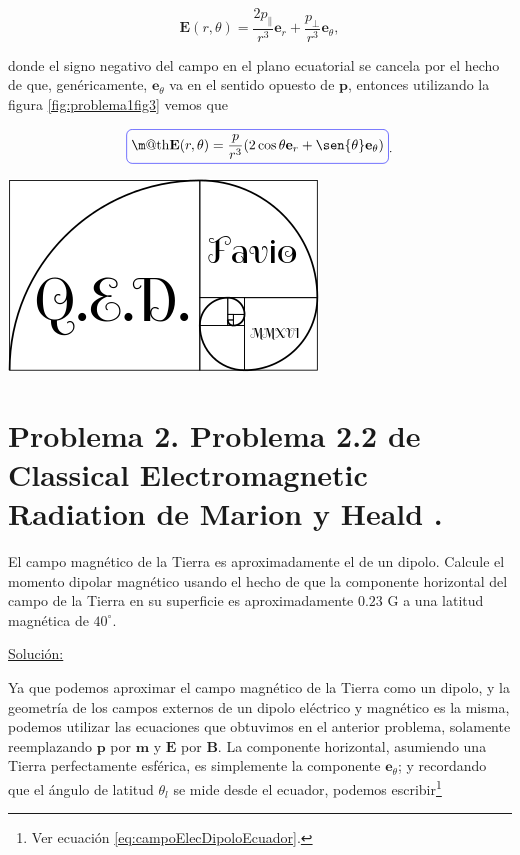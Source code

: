 \documentclass[a4paper,11pt]{article}
\makeatletter
\numberwithin{equation}{section}
\newcommand*{\boxcolor}{blue}
\renewcommand{\boxed}[1]{\textcolor{\boxcolor}{%
\tikz[baseline={([yshift=-1ex]current bounding box.center)}] \node [rectangle, minimum width=1ex,rounded corners,draw] {\normalcolor\m@th$\displaystyle#1$};}}
\makeatother
\begin{document}
\begin{equation}
 \mathbf{E}(r,\theta) = \frac{2p_\parallel}{r^3} \mathbf{e}_r + 
 \frac{p_\bot}{r^3}\mathbf{e}_\theta,
\end{equation}

donde el signo negativo del campo en el plano ecuatorial se cancela por el hecho de 
que, genéricamente, $\mathbf{e}_\theta$ va en el sentido opuesto de $\mathbf{p}$, 
entonces utilizando la figura \eqref{fig:problema1fig3} vemos que 

\begin{equation}
 \boxed{\mathbf{E}(r,\theta) = \frac{p}{r^3}(2\cos{\theta}\mathbf{e}_r + 
 \sen{\theta}\mathbf{e}_\theta)}.
\end{equation}

\hspace{10cm}\includegraphics[scale=0.25]{logoQED}

\newpage

\section{Problema 2. Problema 2.2 de Classical Electromagnetic Radiation
de Marion y Heald \cite{marion2}.}

El campo magnético de la Tierra es aproximadamente el de un dipolo. Calcule el momento 
dipolar magnético usando el hecho de que la componente horizontal del campo de la 
Tierra en su superficie es aproximadamente $0.23$ G a una latitud magnética de 
$40^\circ$.

\vspace{.3cm}

\underline{Solución:} \vspace{.3cm}

Ya que podemos aproximar el campo magnético de la Tierra como un dipolo, y la geometría
de los campos externos de un dipolo eléctrico y magnético es la misma, podemos utilizar 
las ecuaciones que obtuvimos en el anterior problema, solamente reemplazando $\mathbf{p}$ 
por $\mathbf{m}$ y $\mathbf{E}$ por $\mathbf{B}$. La componente horizontal, asumiendo 
una Tierra perfectamente esférica, es simplemente la componente $\mathbf{e}_\theta$; 
y recordando que el ángulo de latitud $\theta_l$ se mide desde el ecuador, podemos 
escribir\footnote{Ver ecuación \eqref{eq:campoElecDipoloEcuador}.}
\end{document}
